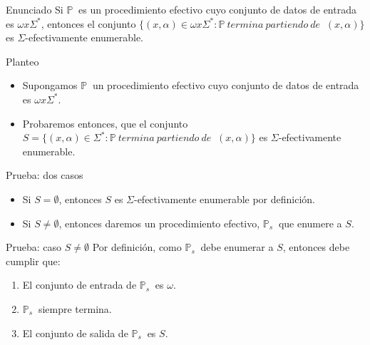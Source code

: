 \documentclass[10pt]{beamer}
\newcommand{\p}{\mathbb{P}}
\begin{document}
\begin{frame}{Enunciado}
  \centering
    Si $\p\ $ es un procedimiento efectivo cuyo conjunto de datos de entrada es
    $\omega x \Sigma^{*}$, entonces el conjunto $\{(x, \alpha) \in \omega x \Sigma^{*}: \p\ termina\ partiendo\ de\ $
    $ (x, \alpha)\}$ es $\Sigma$-efectivamente enumerable.

\end{frame}

\begin{frame}{Planteo}
  \begin{itemize}[<+->]
    \item Supongamos $\p\ $ un procedimiento efectivo cuyo conjunto de datos de
    entrada es $\omega x \Sigma^{*}$.
    \item \centering Probaremos entonces, que el conjunto $S = \{(x, \alpha) \in \Sigma^{*}: \p\ termina\ partiendo\ de\ $
    $ (x, \alpha)\}$ es $\Sigma$-efectivamente enumerable.
  \end{itemize}

\end{frame}



\begin{frame}{Prueba: dos casos}
  \begin{itemize}[<+->]
    \item Si $S = \emptyset$, entonces $S$ es $\Sigma$-efectivamente enumerable por definición.
    \item Si $S \neq \emptyset$, entonces daremos un procedimiento efectivo, $\p_{s}\ $
    que enumere a $S$.
  \end{itemize}

\end{frame}


\begin{frame}{Prueba: caso $S \neq \emptyset$}
  Por definición, como $\p_{s}\ $ debe enumerar a $S$, entonces debe cumplir que:

  \begin{enumerate}[<+->]
    \item El conjunto de entrada de $\p_{s}\ $ es $\omega$.
    \item $\p_{s}\ $ siempre termina.
    \item El conjunto de salida de $\p_{s}\ $ es $S$.
  \end{enumerate}

\end{frame}
\end{document}
